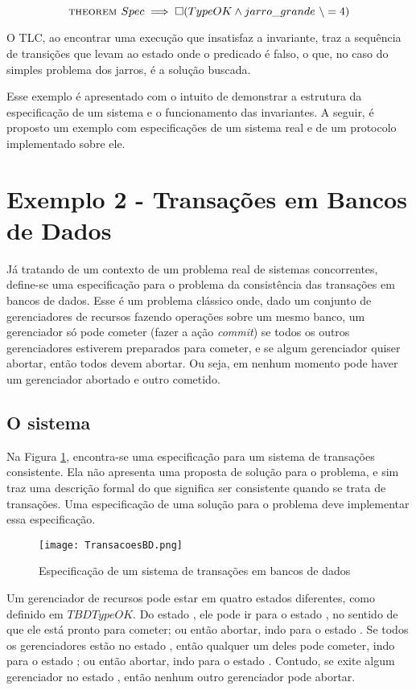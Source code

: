 \[\textsc{theorem } Spec \implies \square (TypeOK \land jarro\_grande\ \backslash= 4)\]

O TLC, ao encontrar uma execução que insatisfaz a invariante, traz a sequência de transições que levam ao estado onde o predicado é falso, o que, no caso do simples problema dos jarros, é a solução buscada.

Esse exemplo é apresentado com o intuito de demonstrar a estrutura da especificação de um sistema e o funcionamento das invariantes. A seguir, é proposto um exemplo com especificações de um sistema real e de um protocolo implementado sobre ele.

\section{Exemplo 2 - Transações em Bancos de Dados}

Já tratando de um contexto de um problema real de sistemas concorrentes, define-se uma especificação para o problema da consistência das transações em bancos de dados. Esse é um problema clássico onde, dado um conjunto de gerenciadores de recursos fazendo operações sobre um mesmo banco, um gerenciador só pode cometer (fazer a ação \textit{commit}) se todos os outros gerenciadores estiverem preparados para cometer, e se algum gerenciador quiser abortar, então todos devem abortar. Ou seja, em nenhum momento pode haver um gerenciador abortado e outro cometido.

\subsection{O sistema}

Na Figura \ref{fig:ex2tla}, encontra-se uma especificação para um sistema de transações consistente. Ela não apresenta uma proposta de solução para o problema, e sim traz uma descrição formal do que significa ser consistente quando se trata de transações. Uma especificação de uma solução para o problema deve implementar essa especificação.

\begin{figure}[h]
  \centering
  \texttt{[image: TransacoesBD.png]}
  \caption{Especificação de um sistema de transações em bancos de dados}
\label{fig:ex2tla}
\end{figure}

Um gerenciador de recursos pode estar em quatro estados diferentes, como definido em $TBDTypeOK$. Do estado \trabalhando, ele pode ir para o estado \preparado, no sentido de que ele está pronto para cometer; ou então abortar, indo para o estado \abortado. Se todos os gerenciadores estão no estado \preparado, então qualquer um deles pode cometer, indo para o estado \cometido; ou então abortar, indo para o estado \abortado. Contudo, se exite algum gerenciador no estado \cometido, então nenhum outro gerenciador pode abortar.

